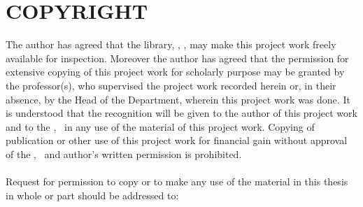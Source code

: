 \section*{COPYRIGHT}
\vspace{0.5cm}

The author has agreed that the library, \thedepartment, \thecampus, may make this project
work freely available for inspection. Moreover the author has agreed that the
permission for extensive copying of this project work for scholarly purpose may be
granted by the professor(s), who supervised the project work recorded herein or, in
their absence, by the Head of the Department, wherein this project work was done. It
is understood that the recognition will be given to the author of this project work and
to the \thedepartment, \thecampus \ in any use of the material of this project work. Copying of publication or other use of
this project work for financial gain without approval of the \thedepartment, \thecampus \ and author's
written permission is prohibited.\\
\\
Request for permission to copy or to make any use of the material in this thesis in
whole or part should be addressed to:\\
\\
\thedepartment\\
\thecampus\\
\thedepartmentFullAddress

